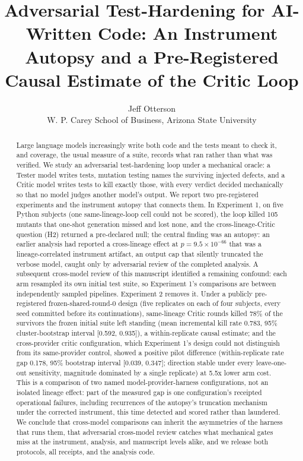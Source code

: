 \documentclass[
  11pt,
]{article}
\title{Adversarial Test-Hardening for AI-Written Code: An Instrument
Autopsy and a Pre-Registered Causal Estimate of the Critic Loop}
\author{Jeff Otterson\\
W. P. Carey School of Business, Arizona State University}
\date{}
\newcounter{none} %
\begin{document}
\maketitle

\begin{abstract}
Large language models increasingly write both code and the tests meant
to check it, and coverage, the usual measure of a suite, records what
ran rather than what was verified. We study an adversarial
test-hardening loop under a mechanical oracle: a Tester model writes
tests, mutation testing names the surviving injected defects, and a
Critic model writes tests to kill exactly those, with every verdict
decided mechanically so that no model judges another model's output. We
report two pre-registered experiments and the instrument autopsy that
connects them. In Experiment 1, on five Python subjects (one
same-lineage-loop cell could not be scored), the loop killed 105 mutants
that one-shot generation missed and lost none, and the
cross-lineage-Critic question (H2) returned a pre-declared null; the
central finding was an autopsy: an earlier analysis had reported a
cross-lineage effect at $p = 9.5 \times 10^{-66}$ that was a
lineage-correlated instrument artifact, an output cap that silently
truncated the verbose model, caught only by adversarial review of the
completed analysis. A subsequent cross-model review of this manuscript
identified a remaining confound: each arm resampled its own initial test
suite, so Experiment 1's comparisons are between independently sampled
pipelines. Experiment 2 removes it. Under a publicly pre-registered
frozen-shared-round-0 design (five replicates on each of four subjects,
every seed committed before its continuations), same-lineage Critic
rounds killed 78\% of the survivors the frozen initial suite left
standing (mean incremental kill rate 0.783, 95\% cluster-bootstrap
interval {[}0.592, 0.935{]}), a within-replicate causal estimate; and
the cross-provider critic configuration, which Experiment 1's design
could not distinguish from its same-provider control, showed a positive
pilot difference (within-replicate rate gap 0.178, 95\% bootstrap
interval {[}0.039, 0.347{]}; direction stable under every leave-one-out
sensitivity, magnitude dominated by a single replicate) at 5.5x lower
arm cost. This is a comparison of two named model-provider-harness
configurations, not an isolated lineage effect: part of the measured gap
is one configuration's receipted operational failures, including
recurrences of the autopsy's truncation mechanism under the corrected
instrument, this time detected and scored rather than laundered. We
conclude that cross-model comparisons can inherit the asymmetries of the
harness that runs them, that adversarial cross-model review catches what
mechanical gates miss at the instrument, analysis, and manuscript levels
alike, and we release both protocols, all receipts, and the analysis
code.
\end{abstract}
\end{document}
